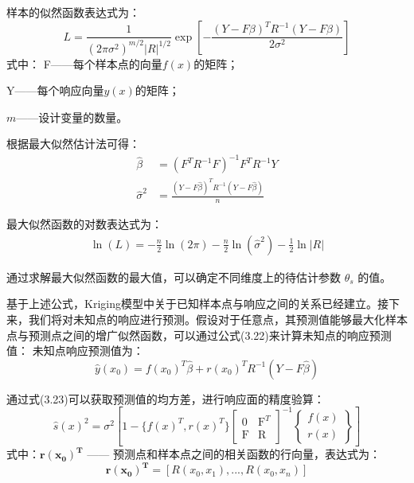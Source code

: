样本的似然函数表达式为：
\begin{equation}
    L = \frac{1}{(2\pi\sigma^2)^{m/2}|R|^{1/2}} \exp\left[-\frac{(Y-F\beta)^T R^{-1}(Y-F\beta)}{2\sigma^2}\right]
    \label{eq:2.7}
\end{equation}
式中：
F——每个样本点的向量$f(x)$的矩阵；

\quad Y——每个响应向量$y(x)$的矩阵；
 
\quad$m$——设计变量的数量。

根据最大似然估计法可得：
\begin{align}
    \hat{\beta} &= (F^T R^{-1} F)^{-1} F^T R^{-1} Y
    \label{eq:2.8} \\
    \hat{\sigma}^2 &= \frac{(Y-F\hat{\beta})^T R^{-1} (Y-F\hat{\beta})}{n}
    \label{eq:2.9} 
\end{align}

最大似然函数的对数表达式为：
\begin{align}
\ln(L) = -\frac{n}{2} \ln(2\pi) - \frac{n}{2} \ln(\hat{\sigma}^2) - \frac{1}{2} \ln |R|
\end{align}

通过求解最大似然函数的最大值，可以确定不同维度上的待估计参数 $\theta_s$ 的值。

基于上述公式，Kriging模型中关于已知样本点与响应之间的关系已经建立。接下来，我们将对未知点的响应进行预测。假设对于任意点，其预测值能够最大化样本点与预测点之间的增广似然函数，可以通过公式(3.22)来计算未知点的响应预测值：
未知点响应预测值为：
\begin{equation}
    \hat{y}(x_0) = f(x_0)^T \hat{\beta} + r(x_0)^T R^{-1} (Y-F\hat{\beta})
    \label{eq:3.22}
\end{equation}

通过式(3.23)可以获取预测值的均方差，进行响应面的精度验算：
\begin{equation}
   \hat{s}(x)^2=\sigma^2\left[1-\{f(x)^T,r(x)^T\}\left[ \begin{array} {cc}0 & \mathrm{F}^T \\ \mathrm{F} & \mathrm{R} \end{array}\right]^{-1}\left\{ \begin{array} {c}f(x) \\ r(x) \end{array}\right\}\right]
    \label{eq:3.23}
\end{equation}
式中：$\mathbf{r(x_0)^T}$ —— 预测点和样本点之间的相关函数的行向量，表达式为：
\begin{equation}
\mathbf{r(x_0)^T} = [R(x_0, x_1), ..., R(x_0, x_n)]
\end{equation}

